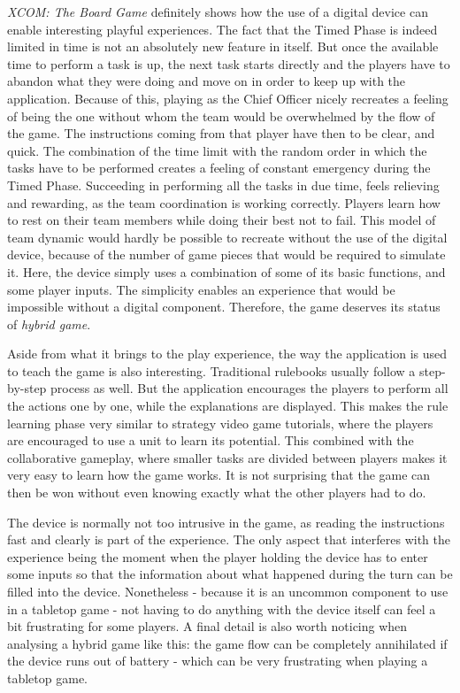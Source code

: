 \textit{XCOM: The Board Game} definitely shows how the use of a digital device can enable interesting playful experiences. The fact that the Timed Phase is indeed limited in time is not an absolutely new feature in itself. But once the available time to perform a task is up, the next task starts directly and the players have to abandon what they were doing and move on in order to keep up with the application. 
Because of this, playing as the Chief Officer nicely recreates a feeling of being the one without whom the team would be overwhelmed by the flow of the game. The instructions coming from that player have then to be clear, and quick. The combination of the time limit with the random order in which the tasks have to be performed creates a feeling of constant emergency during the Timed Phase. Succeeding in performing all the tasks in due time, feels relieving and rewarding, as the team coordination is working correctly. Players learn how to rest on their team members while doing their best not to fail. 
This model of team dynamic would hardly be possible to recreate without the use of the digital device, because of the number of game pieces that would be required to simulate it. Here, the device simply uses a combination of some of its basic functions, and some player inputs. The simplicity enables an experience that would be impossible without a digital component. Therefore, the game deserves its status of \textit{hybrid game}.

Aside from what it brings to the play experience, the way the application is used to teach the game is also interesting. Traditional rulebooks usually follow a step-by-step process as well. But the application encourages the players to perform all the actions one by one, while the explanations are displayed. This makes the rule learning phase very similar to strategy video game tutorials, where the players are encouraged to use a unit to learn its potential. This combined with the collaborative gameplay, where smaller tasks are divided between players makes it very easy to learn how the game works. It is not surprising that the game can then be won without even knowing exactly what the other players had to do.

The device is normally not too intrusive in the game, as reading the instructions fast and clearly is part of the experience. The only aspect that interferes with the experience being the moment when the player holding the device has to enter some inputs so that the information about what happened during the turn can be filled into the device. Nonetheless - because it is an uncommon component to use in a tabletop game - not having to do anything with the device itself can feel a bit frustrating for some players. A final detail is also worth noticing when analysing a hybrid game like this: the game flow can be completely annihilated if the device runs out of battery - which can be very frustrating when playing a tabletop game. 

